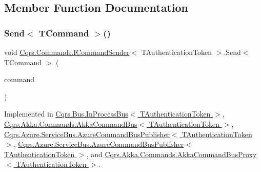 \subsection{Member Function Documentation}
\mbox{\label{interfaceCqrs_1_1Commands_1_1ICommandSender_a551d69f8679399fc0ce0fd99dead507a_a551d69f8679399fc0ce0fd99dead507a}} 
\subsubsection{\texorpdfstring{Send$<$ T\+Command $>$()}{Send< TCommand >()}\hspace{0.1cm}{\footnotesize\ttfamily [1/2]}}
{\footnotesize\ttfamily void \hyperlink{interfaceCqrs_1_1Commands_1_1ICommandSender}{Cqrs.\+Commands.\+I\+Command\+Sender}$<$ T\+Authentication\+Token $>$.Send$<$ T\+Command $>$ (\begin{DoxyParamCaption}\item[{T\+Command}]{command }\end{DoxyParamCaption})}



Implemented in \hyperlink{classCqrs_1_1Bus_1_1InProcessBus_a6a074ef3663d2855875307b106fe4416_a6a074ef3663d2855875307b106fe4416}{Cqrs.\+Bus.\+In\+Process\+Bus$<$ T\+Authentication\+Token $>$}, \hyperlink{classCqrs_1_1Akka_1_1Commands_1_1AkkaCommandBus_a696f471533265685f80922e39727288e_a696f471533265685f80922e39727288e}{Cqrs.\+Akka.\+Commands.\+Akka\+Command\+Bus$<$ T\+Authentication\+Token $>$}, \hyperlink{classCqrs_1_1Azure_1_1ServiceBus_1_1AzureCommandBusPublisher_ad4bbbadcac7eb6a83e47649979bc2e7f_ad4bbbadcac7eb6a83e47649979bc2e7f}{Cqrs.\+Azure.\+Service\+Bus.\+Azure\+Command\+Bus\+Publisher$<$ T\+Authentication\+Token $>$}, \hyperlink{classCqrs_1_1Azure_1_1ServiceBus_1_1AzureCommandBusPublisher_ad4bbbadcac7eb6a83e47649979bc2e7f_ad4bbbadcac7eb6a83e47649979bc2e7f}{Cqrs.\+Azure.\+Service\+Bus.\+Azure\+Command\+Bus\+Publisher$<$ T\+Authentication\+Token $>$}, and \hyperlink{classCqrs_1_1Akka_1_1Commands_1_1AkkaCommandBusProxy_a15945f41b7439e722f5608f48b63c6d9_a15945f41b7439e722f5608f48b63c6d9}{Cqrs.\+Akka.\+Commands.\+Akka\+Command\+Bus\+Proxy$<$ T\+Authentication\+Token $>$}.

